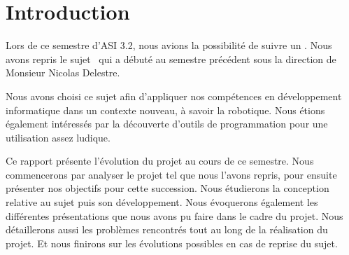 \section{Introduction}
\label{sec:Introduction}

\par Lors de ce semestre d'ASI 3.2, nous avions la possibilité de suivre un \pao.
Nous avons repris le sujet \projet\ qui a débuté au semestre précédent sous la direction de Monsieur Nicolas Delestre.

\par Nous avons choisi ce sujet afin d'appliquer nos compétences en développement informatique dans un contexte nouveau, à savoir la robotique.
Nous étions également intéressés par la découverte d'outils de programmation pour une utilisation assez ludique.

\par Ce rapport présente l'évolution du projet au cours de ce semestre.
Nous commencerons par analyser le projet tel que nous l'avons repris, pour ensuite présenter nos objectifs pour cette succession.
Nous étudierons la conception relative au sujet puis son développement. Nous évoquerons également les différentes présentations que nous avons pu faire dans le cadre du projet. Nous détaillerons aussi les problèmes rencontrés tout au long de la réalisation du projet.
Et nous finirons sur les évolutions possibles en cas de reprise du sujet.


\pagebreak
